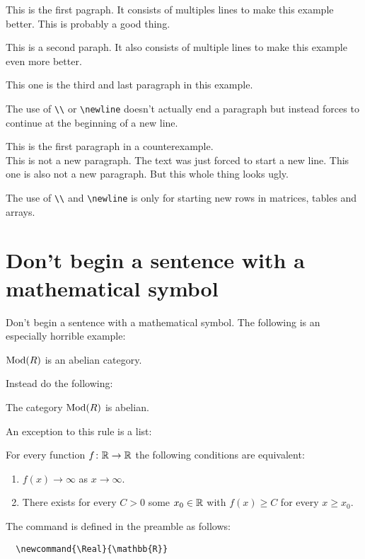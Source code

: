 \documentclass[a4paper, 10pt, abstract=on, headings=standardclasses]{scrartcl}
\begin{document}
\begin{LTXexample}[pos = r]
  This is the first pagraph.
  It consists of multiples lines to make this example better.
  This is probably a good thing.
  
  This is a second paraph.
  It also consists of multiple lines to make this example even more better.
  
  This one is the third and last paragraph in this example.
\end{LTXexample}
The use of \texttt{\textbackslash\textbackslash} or \texttt{{\textbackslash}newline} doesn’t actually end a paragraph but instead forces  to continue at the beginning of a new line.
\begin{LTXexample}[pos = r]
  This is the first paragraph in a counterexample.\\
  This is not a new paragraph.
  The text was just forced to start a new line.\newline
  This one is also not a new paragraph.
  But this whole thing looks ugly.
\end{LTXexample}
The use of \texttt{\textbackslash\textbackslash} and \texttt{{\textbackslash}newline} is only for starting new rows in matrices, tables and arrays.





\section{Don’t begin a sentence with a mathematical symbol}

Don’t begin a sentence with a mathematical symbol.
The following is an especially horrible example:
\begin{LTXexample}[pos = b]
  \begin{theorem}
    $\operatorname{Mod}(R)$ is an abelian category.
  \end{theorem}
\end{LTXexample}
Instead do the following:
\begin{LTXexample}[pos = b]
  \begin{theorem}
    The category $\operatorname{Mod}(R)$ is abelian.
  \end{theorem}
\end{LTXexample}
An exception to this rule is a list:
\begin{LTXexample}[pos = b]
  For every function $f \colon \Real \to \Real$ the following conditions are equivalent:
  \begin{enumerate}
    \item
      $f(x) \to \infty$ as $x \to \infty$.
    \item
      There exists for every $C > 0$ some $x_0 \in \Real$ with $f(x) \geq C$ for every $x \geq x_0$.
  \end{enumerate}
\end{LTXexample}
The command  is defined in the preamble as follows:
\begin{lstlisting}
  \newcommand{\Real}{\mathbb{R}}
\end{lstlisting}
\end{document}

